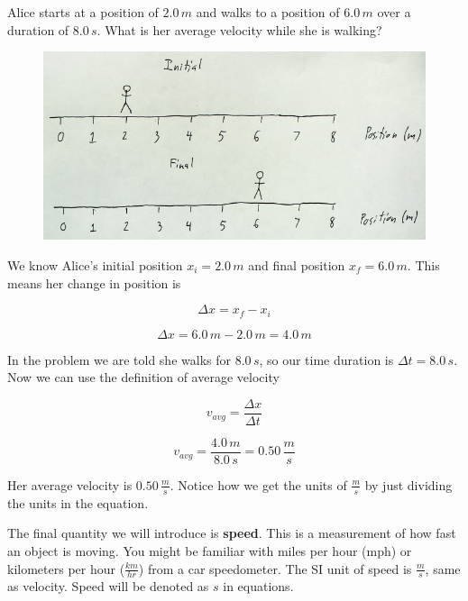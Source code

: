 \documentclass[12pt]{book}
\begin{document}
\linespace

\example

Alice starts at a position of $2.0 \, m$ and walks to a position of $6.0 \, m$ over a duration of $8.0 \, s$. What is her average velocity while she is walking?

\begin{figure}[h]
\centering
\includegraphics[scale=0.8]{example_units_velocity_walking.png}
\end{figure}

We know Alice's initial position $x_i = 2.0 \, m$ and final position $x_f = 6.0 \, m$. This means her change in position is

\begin{equation}
\Delta x = x_f - x_i
\end{equation}

\begin{equation}
\Delta x = 6.0 \, m - 2.0 \, m = 4.0 \, m
\end{equation}

In the problem we are told she walks for $8.0 \, s$, so our time duration is $\Delta t = 8.0 \, s$. Now we can use the definition of average velocity

\begin{equation}
v_{avg} = \frac{\Delta x}{\Delta t}
\end{equation}

\begin{equation}
v_{avg} = \frac{4.0 \, m}{8.0 \, s} = 0.50 \, \frac{m}{s}
\end{equation}

Her average velocity is $0.50 \, \frac{m}{s}$. Notice how we get the units of $\frac{m}{s}$ by just dividing the units in the equation.

\linespace

The final quantity we will introduce is \textbf{speed}. This is a measurement of how fast an object is moving. You might be familiar with miles per hour (mph) or kilometers per hour ($\frac{km}{hr}$) from a car speedometer. The SI unit of speed is $\frac{m}{s}$, same as velocity. Speed will be denoted as $s$ in equations.
\end{document}
